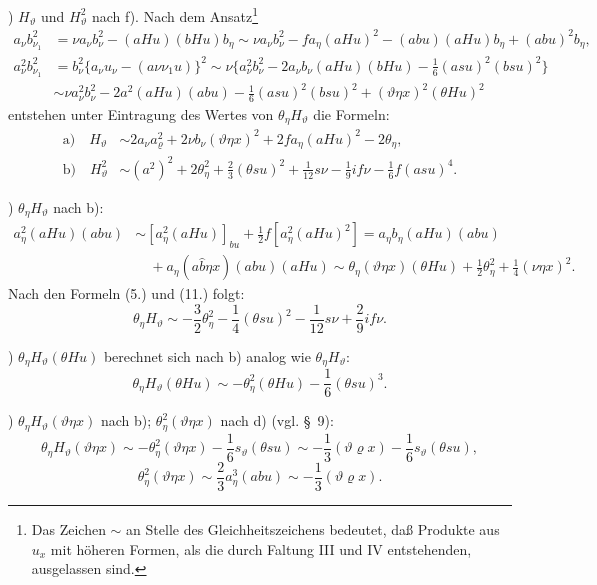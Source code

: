 \documentclass[11pt]{article}
\newcommand{\R}{\varrho}
\begin{document}
) $H_\vartheta$ und $H_\vartheta^2$ nach f). Nach dem Ansatz\footnote{Das Zeichen $\sim$ an Stelle des Gleichheitszeichens bedeutet, daß Produkte aus $u_x$ mit höheren Formen, als die durch Faltung III und IV entstehenden, ausgelassen sind.}
\[
\begin{aligned}
a_\nu b_{\nu_1}^2
&=\nu a_\nu b_\nu^2-(aHu)(bHu)b_\eta
\sim \nu a_\nu b_\nu^2-f a_\eta(aHu)^2-(abu)(aHu)b_\eta+(abu)^2b_\eta,\\
a_\nu^2b_{\nu_1}^2
&=b_\nu^2\{a_\nu u_\nu-(a\nu\nu_1u)\}^2
\sim \nu\{a_\nu^2b_\nu^2-2a_\nu b_\nu(aHu)(bHu)
-\frac16(asu)^2(bsu)^2\}\\
&\sim \nu a_\nu^2b_\nu^2-2a^2(aHu)(abu)-\frac16(asu)^2(bsu)^2+(\vartheta\eta x)^2(\theta Hu)^2
\end{aligned}
\]
entstehen unter Eintragung des Wertes von $\theta_\eta H_\vartheta$ die Formeln:
\[
\tag{12}
\begin{aligned}
\text{a)}\quad H_\vartheta&\sim 2a_\nu a_\R^2+2\nu b_\nu(\vartheta\eta x)^2+2f a_\eta(aHu)^2-2\theta_\eta,\\
\text{b)}\quad H_\vartheta^2&\sim (a^2)^2+2\theta_\eta^2+\frac23(\theta su)^2
+\frac1{12}s\nu-\frac19if\nu-\frac16f(asu)^4.
\end{aligned}
\]

) $\theta_\eta H_\vartheta$ nach b):
\[
\begin{aligned}
a_\eta^2(aHu)(abu)&\sim [a_\eta^2(aHu)]_{bu}+\frac12 f[a_\eta^2(aHu)^2]
=a_\eta b_\eta(aHu)(abu)\\
&\quad+a_\eta(a\widehat{b}\eta x)(abu)(aHu)
\sim \theta_\eta(\vartheta\eta x)(\theta Hu)+\frac12\theta_\eta^2+\frac14(\nu\eta x)^2.
\end{aligned}
\]
Nach den Formeln (5.) und (11.) folgt:
\[
\theta_\eta H_\vartheta\sim -\frac32\theta_\eta^2-\frac14(\theta su)^2-\frac1{12}s\nu+\frac29if\nu.
\]

) $\theta_\eta H_\vartheta(\theta Hu)$ berechnet sich nach b) analog wie $\theta_\eta H_\vartheta$:
\[
\theta_\eta H_\vartheta(\theta Hu)\sim-\theta_\eta^2(\theta Hu)-\frac16(\theta su)^3.
\]

) $\theta_\eta H_\vartheta(\vartheta\eta x)$ nach b); $\theta_\eta^2(\vartheta\eta x)$ nach d) (vgl. \S\ 9):
\[
\theta_\eta H_\vartheta(\vartheta\eta x)\sim-\theta_\eta^2(\vartheta\eta x)-\frac16s_\vartheta(\theta su)
\sim-\frac13(\vartheta\R x)-\frac16s_\vartheta(\theta su),
\]
\[
\theta_\eta^2(\vartheta\eta x)\sim\frac23a_\eta^3(abu)\sim-\frac13(\vartheta\R x).
\]
\end{document}
